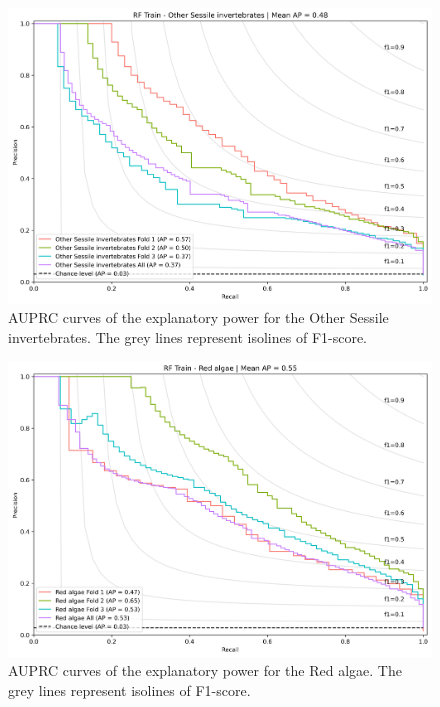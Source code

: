 \begin{figure}
\hypertarget{fig:chap3figS30}{%
\centering
\includegraphics{03-Chapitre3/figures/supplementary/03-precision_recall_curve_train_rf_Other Sessile invertebrates.png}
\caption{AUPRC curves of the explanatory power for the Other Sessile
invertebrates. The grey lines represent isolines of
F1-score.}\label{fig:chap3figS30}
}
\end{figure}

\begin{figure}
\hypertarget{fig:chap3figS31}{%
\centering
\includegraphics{03-Chapitre3/figures/supplementary/03-precision_recall_curve_train_rf_Red algae.png}
\caption{AUPRC curves of the explanatory power for the Red algae. The
grey lines represent isolines of F1-score.}\label{fig:chap3figS31}
}
\end{figure}

